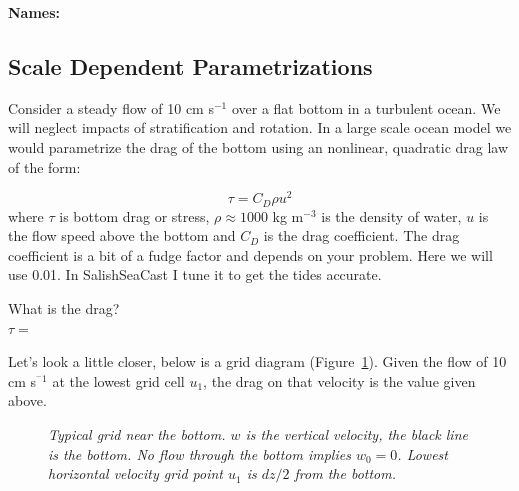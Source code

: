 
{\bf\large Names:}


\subsection*{Scale Dependent Parametrizations}

Consider a steady flow of 10 cm s$^{-1}$ over a flat bottom in a turbulent ocean.  We will neglect impacts of stratification and rotation.  In a large scale ocean model we would parametrize the drag of the bottom using an nonlinear, quadratic drag law of the form:

\begin{equation}
\tau = C_D \rho u^2
\label{eq:drag}
\end{equation}
where $\tau$ is bottom drag or stress, $\rho \approx 1000$ kg m$^{-3}$ is the density of water, $u$ is the flow speed above the bottom and $C_D$ is the drag coefficient.  The drag coefficient is a bit of a fudge factor and depends on your problem.  Here we will use 0.01.  In SalishSeaCast I tune it to get the tides accurate.

\begin{question}
What is the drag? \\
$\tau = $\\[24pt]
\end{question}

Let's look a little closer, below is a grid diagram
(Figure~\ref{plt:grid}).  Given the flow of 10 cm s$^{^-1}$ at the
lowest grid cell $u_1$, the drag on that velocity is the value given above.

\begin{figure}[h]
\caption{\protect\it{Typical grid near the bottom. $w$ is the vertical
    velocity, the black line is the bottom. No flow through the bottom
    implies $w_0 = 0$.} Lowest horizontal velocity grid point $u_1$ is
  $dz/2$ from the bottom.}
\label{plt:grid}
\end{figure}

